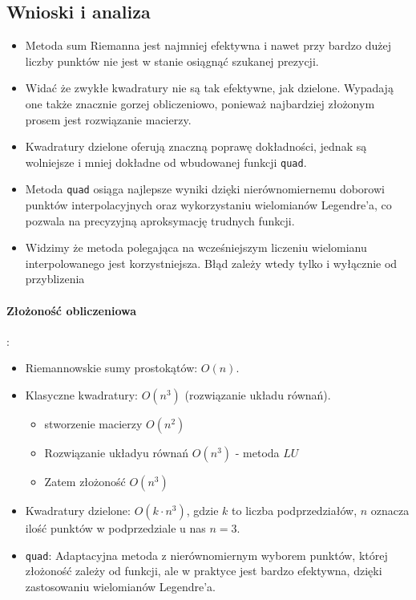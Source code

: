 \subsection{Wnioski i analiza} 
\begin{itemize}
    \item Metoda sum Riemanna jest najmniej efektywna i nawet przy bardzo dużej liczby punktów nie jest w stanie osiągnąć szukanej prezycji.
    \item Widać że zwykłe kwadratury nie są tak efektywne, jak dzielone. Wypadają one także znacznie gorzej obliczeniowo, ponieważ najbardziej złożonym prosem jest rozwiązanie macierzy. 
    \item Kwadratury dzielone oferują znaczną poprawę dokładności, jednak są wolniejsze i mniej dokładne od wbudowanej funkcji \texttt{quad}.
    \item Metoda \texttt{quad} osiąga najlepsze wyniki dzięki nierównomiernemu doborowi punktów interpolacyjnych oraz wykorzystaniu wielomianów Legendre’a, co pozwala na precyzyjną aproksymację trudnych funkcji. %
    \item Widzimy że metoda polegająca na wcześniejszym liczeniu wielomianu interpolowanego jest korzystniejsza. Błąd zależy wtedy tylko i wyłącznie od przyblizenia %
\end{itemize}
\paragraph{Złożoność obliczeniowa}:
\begin{itemize}
    \item Riemannowskie sumy prostokątów: \( O(n) \).
    \item Klasyczne kwadratury: \( O(n^3) \) (rozwiązanie układu równań).
    \begin{itemize}
        \item stworzenie macierzy $O(n^2)$
        \item Rozwiązanie układyu równań $O(n^3)$ - metoda $LU$ %
        \item Zatem złożoność $O(n^3)$
    \end{itemize}
    \item Kwadratury dzielone: \( O(k \cdot n^3) \), gdzie \( k \) to liczba podprzedziałów, \( n \) oznacza ilość punktów w podprzedziale u nas \(n=3\).
    \item \texttt{quad}: Adaptacyjna metoda z nierównomiernym wyborem punktów, której złożoność zależy od funkcji, ale w praktyce jest bardzo efektywna, dzięki zastosowaniu wielomianów Legendre'a. %
\end{itemize}


